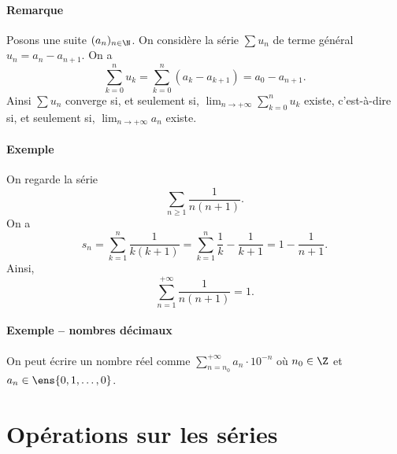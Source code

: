\documentclass{livre}
\begin{document}
\paragraph{Remarque}Posons une suite $(a_n)_{n\in \N}$. On considère la série $\sum u_n$ de terme général $u_n = a_n - a_{n+1}$. On a \[ \sum_{k=0}^{n} u_k = \sum_{k=0}^{n}(a_k - a_{k+1}) = a_0 - a_{n+1}. \]Ainsi $\sum u_n$ converge si, et seulement si, $\lim_{n\to +\infty} \sum_{k=0}^{n}u_k$ existe, c'est-à-dire si, et seulement si, $\lim_{n\to +\infty} a_n$ existe.

\paragraph{Exemple}On regarde la série \[\sum_{n\geq 1}\frac{1}{n(n+1)}.\]On a \[ s_n = \sum_{k=1}^{n} \frac{1}{k(k+1)} = \sum_{k=1}^{n}\frac{1}{k}-\frac{1}{k+1} = 1 - \frac{1}{n+1}.\]Ainsi, \[ \sum_{n=1}^{+\infty}\frac{1}{n(n+1)} = 1.\]

\paragraph{Exemple -- nombres décimaux}On peut écrire un nombre réel comme $\sum_{n=n_0}^{+\infty}a_n\cdot 10^{-n}$ où $n_0\in \Z$ et $a_n \in \ens{0,1,\ldots,0}$.

\section{Opérations sur les séries}
\end{document}
